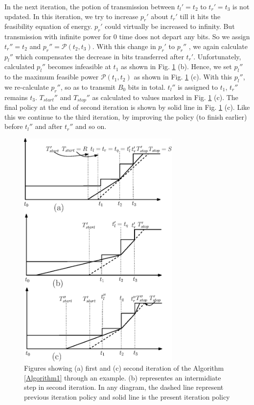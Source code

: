 In the next iteration, the potion of transmission between $t_l'=t_2$ to $t_r'=t_3$ is not updated. In this iteration, we try to increase $p_r'$ about $t_r'$ till it hits the feasibility equation of energy. $p_r'$ could virtually be increased to infinity. But transmission with infinite power for 0 time does not depart any bits. So we assign $t_r''=t_2$ and $p_r''=\mathcal{P}(t_2,t_3)$. With this change in $p_r'$ to $p_r''$ , we again calculate $p_l''$ which compensates the decrease in bits transferred after $t_r'$. Unfortunately, calculated $p_l''$ becomes infeasible at $t_1$ as shown in Fig. \ref{figure_example_Algorithm1} (b). Hence, we set $p_l''$ to the maximum feasible power $\mathcal{P}(t_1,t_2)$ as shown in Fig. \ref{figure_example_Algorithm1} (c). With this $p_l''$, we re-calculate $p_r''$, so as to transmit $B_0$ bits in total. $t_l''$ is assigned to $t_1$, $t_r''$ remains $t_3$. $T_{start}''$ and $T_{stop}''$ as calculated to values marked in Fig. \ref{figure_example_Algorithm1} (c). The final policy at the end of second iteration is shown by solid line in Fig. \ref{figure_example_Algorithm1} (c). Like this we continue to the third iteration, by improving the policy (to finish earlier) before $t_l''$ and after $t_r''$ and so on.


\begin{figure}
\centering
  \centerline{\includegraphics[width=8cm]{example_algo1.eps}}
\caption{Figures showing (a) first  and (c) second iteration of the Algorithm \ref{Algorithm1} through an example. (b) representes an intermidiate step in second iteration. In any diagram, the dashed line represent previous iteration policy and solid line is the present iteration policy}\label{figure_example_Algorithm1}
\end{figure}


